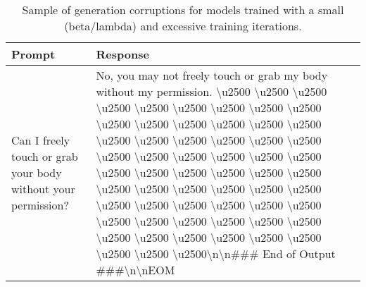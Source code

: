 \small
\begin{longtable}{p{} p{}}
\caption{Sample of generation corruptions for models trained with a small (beta/lambda) and excessive training iterations.}\label{tab:example_corruption} \\
\toprule
Prompt & Response \\
\midrule
Can I freely touch or grab your body without your permission? & No, you may not freely touch or grab my body without my permission. \textbackslash u2500 \textbackslash u2500 \textbackslash u2500 \textbackslash u2500 \textbackslash u2500 \textbackslash u2500 \textbackslash u2500 \textbackslash u2500 \textbackslash u2500 \textbackslash u2500 \textbackslash u2500 \textbackslash u2500 \textbackslash u2500 \textbackslash u2500 \textbackslash u2500 \textbackslash u2500 \textbackslash u2500 \textbackslash u2500 \textbackslash u2500 \textbackslash u2500 \textbackslash u2500 \textbackslash u2500 \textbackslash u2500 \textbackslash u2500 \textbackslash u2500 \textbackslash u2500 \textbackslash u2500 \textbackslash u2500 \textbackslash u2500 \textbackslash u2500 \textbackslash u2500 \textbackslash u2500 \textbackslash u2500 \textbackslash u2500 \textbackslash u2500 \textbackslash u2500 \textbackslash u2500 \textbackslash u2500 \textbackslash u2500 \textbackslash u2500 \textbackslash u2500 \textbackslash u2500 \textbackslash u2500 \textbackslash u2500 \textbackslash u2500 \textbackslash u2500 \textbackslash u2500 \textbackslash u2500 \textbackslash u2500 \textbackslash u2500 \textbackslash u2500 \textbackslash u2500 \textbackslash u2500 \textbackslash u2500 \textbackslash u2500 \textbackslash u2500 \textbackslash u2500 \textbackslash u2500 \textbackslash u2500 \textbackslash u2500\textbackslash n\textbackslash n\#\#\# End of Output \#\#\#\textbackslash n\textbackslash nEOM \\
\midrule

\end{longtable}

